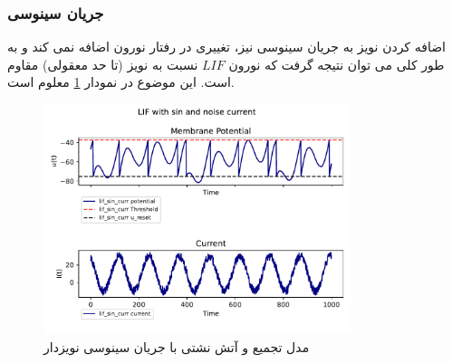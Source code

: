 \documentclass{article}
\begin{document}
            \subsubsection{جریان سینوسی}
                اضافه کردن نویز به جریان سینوسی نیز، تغییری در رفتار نورون اضافه نمی کند و به طور کلی می توان نتیجه گرفت که نورون 
                $LIF$ 
                نسبت به نویز (تا حد معقولی)
                مقاوم است. این موضوع در نمودار 
                \ref{fig:lif-sin-noise-curr}
                معلوم است.
                \begin{figure}[H]
                    \centering
                    \includegraphics[width=0.8\textwidth]{plots/LIF with sin and noise current.pdf} 
                    \caption{مدل تجمیع و آتش نشتی با جریان سینوسی نویزدار}
                    \label{fig:lif-sin-noise-curr}
                \end{figure}
\end{document}

